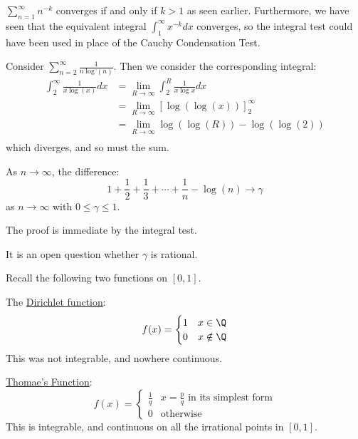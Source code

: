 \documentclass[../Main.tex]{subfiles}
\begin{document}
\begin{examples}{}
    \item $\sum_{n = 1}^\infty n^{-k}$ converges if and only if $k > 1$ as seen earlier. Furthermore, we have seen that the equivalent integral $\int_1^\infty x^{-k} dx$ converges, so the integral test could have been used in place of the Cauchy Condensation Test.
    \item Consider $\sum_{n = 2}^\infty \frac{1}{n \log(n)}$. Then we consider the corresponding integral:
        \begin{align*}
            \int_2^\infty \frac{1}{x \log(x)}dx &= \lim_{R \to \infty} \int_2^R \frac{1}{x \log{x}} dx \\
            &= \lim_{R \to \infty} \left[\log(\log(x))\right]_2^\infty \\
            &= \lim_{R \to \infty} \log(\log(R)) - \log(\log(2)) \\
        \end{align*}
        which diverges, and so must the sum.
\end{examples}
\begin{corollary}
    As $n \to \infty$, the difference:
    \begin{equation*}
        1 + \frac{1}{2} + \frac{1}{3} + \cdots + \frac{1}{n} - \log(n) \to \gamma
    \end{equation*}
    as $n \to \infty$ with $0 \leq \gamma \leq 1$.
\end{corollary}
The proof is immediate by the integral test.
\begin{remark}
    It is an open question whether $\gamma$ is rational.
\end{remark}
Recall the following two functions on $[0, 1]$.

The \underline{Dirichlet function}:
\begin{equation*}
    f(x) = 
    \begin{cases}
        1 & x \in \Q \\
        0 & x \notin \Q
    \end{cases}
\end{equation*}
This was not integrable, and nowhere continuous.

\underline{Thomae's Function}:
\begin{equation*}
    f(x) =
    \begin{cases}
        \frac{1}{q} & x = \frac{p}{q} \text{ in its simplest form} \\
        0 & \text{otherwise}
    \end{cases}
\end{equation*}
This is integrable, and continuous on all the irrational points in $[0, 1]$.
\end{document}

